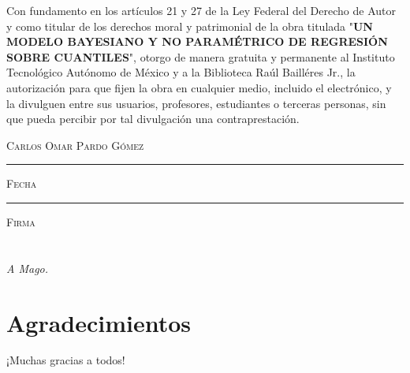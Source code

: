 \documentclass[letterpaper,onside,11pt,review,usenames,dvipsnames]{report}
\begin{document}
\thispagestyle{empty}
\vspace*{\fill}
\begingroup
Con fundamento en los art\'iculos 21 y 27 de la Ley Federal del Derecho de Autor y como titular de los derechos moral y patrimonial de la obra titulada "\textbf{UN MODELO BAYESIANO Y NO PARAM\'ETRICO DE REGRESI\'ON SOBRE CUANTILES}", otorgo de manera gratuita y permanente al Instituto Tecnol\'ogico Aut\'onomo de M\'exico y a la Biblioteca Ra\'ul Baill\'eres Jr., la autorizaci\'on para que fijen la obra en cualquier medio, incluido el electr\'onico, y la divulguen entre sus usuarios, profesores, estudiantes o terceras personas, sin que pueda percibir por tal divulgaci\'on una contraprestaci\'on.

\centering

\hspace{3em}

\textsc{Carlos Omar Pardo G\'omez}

\vspace{4em}

\rule[1em]{20em}{0.5pt} %

\textsc{Fecha}
 
\vspace{6em}

\rule[1em]{20em}{0.5pt} %

\textsc{Firma}

\endgroup
\vspace*{\fill}

\pagestyle{empty}
\frontmatter

\chapter*{}
\begin{flushright}
\textit{A Mago.}
\end{flushright}


\chapter*{Agradecimientos}
¡Muchas gracias a todos!
\end{document}
